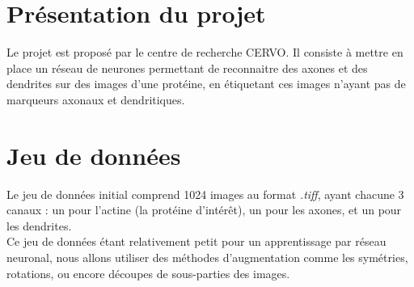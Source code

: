 \documentclass{report}
\begin{document}
\section{Présentation du projet}

Le projet est proposé par le centre de recherche CERVO. Il consiste à mettre en
place un réseau de neurones permettant de reconnaitre des axones et des dendrites
sur des images d’une protéine, en étiquetant ces images n’ayant pas de marqueurs
axonaux et dendritiques.

\section{Jeu de données}

Le jeu de données initial comprend 1024 images au format \textit{.tiff}, ayant
chacune 3 canaux : un pour l'actine (la protéine d'intérêt), un pour les axones,
et un pour les dendrites. \\
Ce jeu de données étant relativement petit pour un apprentissage par réseau neuronal,
nous allons utiliser des méthodes d'augmentation comme les symétries, rotations, ou
encore découpes de sous-parties des images.
\end{document}
